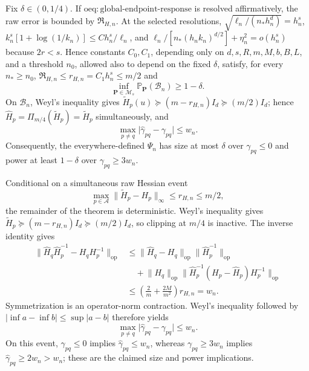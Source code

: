 Fix \(\delta\in(0,1/4)\).  If \(\mathrm{oeq:global\text{-}endpoint\text{-}response}\) is resolved affirmatively, the raw error is bounded by \(\mathfrak R_{H,n}\). At the selected resolutions, \(\sqrt{\ell_n/(n_\ast h_n^d)}=h_n^s\), \(k_n^s[1+\log(1/k_n)]\le Ch_n^s/\ell_n\), and \(\ell_n/[n_\ast(h_nk_n)^{d/2}]+\eta_n^2=o(h_n^s)\) because \(2r<s\). Hence constants \(C_0,C_1\), depending only on \(d,s,R,m,M,b,B,L\), and a threshold \(n_0\), allowed also to depend on the fixed \(\delta\), satisfy, for every \(n_\ast\ge n_0\), \(\mathfrak R_{H,n}\le r_{H,n}=C_1h_n^s\le m/2\) and
\[
 \inf_{\mathbf P\in\mathcal M_s}\mathbb P_{\mathbf P}(\mathcal B_n)\ge1-\delta.
\]
On \(\mathcal B_n\), Weyl's inequality gives \(\widetilde H_p(u)\succeq(m-r_{H,n})I_d\succeq(m/2)I_d\); hence \(\widehat H_p=\Pi_{m/4}(\widetilde H_p)=\widetilde H_p\) simultaneously, and
\[
 \max_{p\ne q}\lvert\widehat\gamma_{pq}-\gamma_{pq}\rvert\le w_n.
\]
Consequently, the everywhere-defined \(\Psi_n\) has size at most \(\delta\) over \(\gamma_{pq}\le0\) and power at least \(1-\delta\) over \(\gamma_{pq}\ge3w_n\).

Conditional on a simultaneous raw Hessian event
\[
 \max_{p\in\mathcal A}\lVert\widetilde H_p-H_p\rVert_\infty\le r_{H,n}\le m/2,
\]
the remainder of the theorem is deterministic.  Weyl's inequality gives \(\widetilde H_p\succeq(m-r_{H,n})I_d\succeq(m/2)I_d\), so clipping at \(m/4\) is inactive.  The inverse identity gives
\[
 \begin{aligned}
 \lVert\widehat H_q\widehat H_p^{-1}-H_qH_p^{-1}\rVert_{\mathrm{op}}
 &\le \lVert\widehat H_q-H_q\rVert_{\mathrm{op}}\lVert\widehat H_p^{-1}\rVert_{\mathrm{op}}\\
 &\quad+\lVert H_q\rVert_{\mathrm{op}}
 \lVert\widehat H_p^{-1}(H_p-\widehat H_p)H_p^{-1}\rVert_{\mathrm{op}}\\
 &\le\left(\frac2m+\frac{2M}{m^2}\right)r_{H,n}=w_n.
 \end{aligned}
\]
Symmetrization is an operator-norm contraction.  Weyl's inequality followed by
\(\lvert\inf a-\inf b\rvert\le\sup\lvert a-b\rvert\) therefore yields
\[
 \max_{p\ne q}\lvert\widehat\gamma_{pq}-\gamma_{pq}\rvert\le w_n.
\]
On this event, \(\gamma_{pq}\le0\) implies \(\widehat\gamma_{pq}\le w_n\), whereas \(\gamma_{pq}\ge3w_n\) implies \(\widehat\gamma_{pq}\ge2w_n>w_n\); these are the claimed size and power implications.


